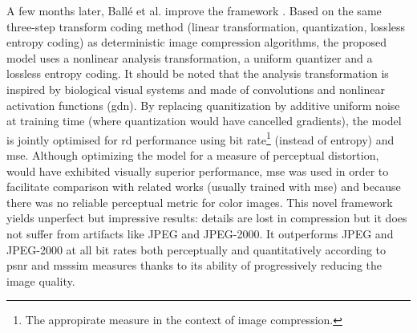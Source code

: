 A few months later, Ballé et al. improve the framework \cite{ballé2017endtoendoptimizedimagecompression}. Based on the same three-step transform coding method (linear transformation, quantization, lossless entropy coding) as deterministic image compression algorithms, the proposed model uses a nonlinear analysis transformation, a uniform quantizer and a lossless entropy coding. It should be noted that the analysis transformation is inspired by biological visual systems and made of convolutions and nonlinear activation functions (\acrshort{gdn}). By replacing quanitization by additive uniform noise at training time (where quantization would have cancelled gradients), the model is jointly optimised for \acrshort{rd} performance using bit rate\footnote{The appropirate measure in the context of image compression.} (instead of entropy) and \acrshort{mse}. Although optimizing the model for a measure of perceptual distortion, would have exhibited visually superior performance, \acrshort{mse} was used in order to facilitate comparison with related works (usually trained with \acrshort{mse}) and because there was no reliable perceptual metric for color images. This novel framework yields unperfect but impressive results: details are lost in compression but it does not suffer from artifacts like JPEG and JPEG-2000. It outperforms JPEG and JPEG-2000 at all bit rates both perceptually and quantitatively according to \acrshort{psnr} and \acrshort{msssim} measures thanks to its ability of progressively reducing the image quality.

